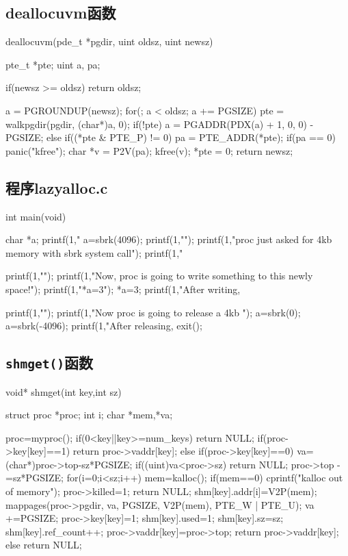 \documentclass{swfuthesism}
\begin{document}
\subsection{deallocuvm函数}
\label{sec:deallocuvm}

\begin{ccode}
deallocuvm(pde_t *pgdir, uint oldsz, uint newsz)
{
  pte_t *pte;
  uint a, pa;

  if(newsz >= oldsz)
    return oldsz;

  a = PGROUNDUP(newsz);
  for(; a  < oldsz; a += PGSIZE){
    pte = walkpgdir(pgdir, (char*)a, 0);
    if(!pte)
      a = PGADDR(PDX(a) + 1, 0, 0) - PGSIZE;
    else if((*pte & PTE_P) != 0){
      pa = PTE_ADDR(*pte);
      if(pa == 0)
        panic("kfree");
      char *v = P2V(pa);
      kfree(v);
      *pte = 0;
    }
  }
  return newsz;
}
\end{ccode}

\subsection{程序lazyalloc.c}
\label{sec:lazyalloc}

\begin{ccode}
int main(void)
{
  char *a;
  printf(1,"%
  a=sbrk(4096);
  printf(1,"\n");
  printf(1,"proc just asked for 4kb memory with sbrk system call\n\n");
  printf(1,"%

  printf(1,"\n");
  printf(1,"Now, proc is going to write something to this newly space!\n");
  printf(1,"*a=3\n");
  *a=3;
  printf(1,"After writing, %

  printf(1,"\n");
  printf(1,"Now proc is going to release a 4kb \n\n");
  a=sbrk(0);
  a=sbrk(-4096);
  printf(1,"After releasing, %
  exit();
}
\end{ccode}

\subsection{\texttt{shmget()}函数}
\label{sec:shmget}
\begin{ccode}
void* shmget(int key,int sz)
{
  struct proc *proc;
  int i;
  char *mem,*va;
  
  proc=myproc();
  if(0<key||key>=num_keys)
    return NULL;
  if(proc->key[key]==1)
  {
    return proc->vaddr[key];
  }
  else if(proc->key[key]==0)
  {
    va=(char*)proc->top-sz*PGSIZE;
    if((uint)va<proc->sz)
      return NULL;
    proc->top -=sz*PGSIZE;
    for(i=0;i<sz;i++){
      mem=kalloc();
      if(mem==0)
      {
        cprintf("kalloc out of memory\n");
        proc->killed=1;
        return NULL;
      }
      shm[key].addr[i]=V2P(mem);
    mappages(proc->pgdir, va, PGSIZE, V2P(mem), PTE_W | PTE_U);
    va +=PGSIZE;
    }
    proc->key[key]=1;
    shm[key].used=1;
    shm[key].sz=sz;
    shm[key].ref_count++;
    proc->vaddr[key]=proc->top;
    return proc->vaddr[key];
  }
  else
    return NULL;
}
\end{ccode}
\end{document}
